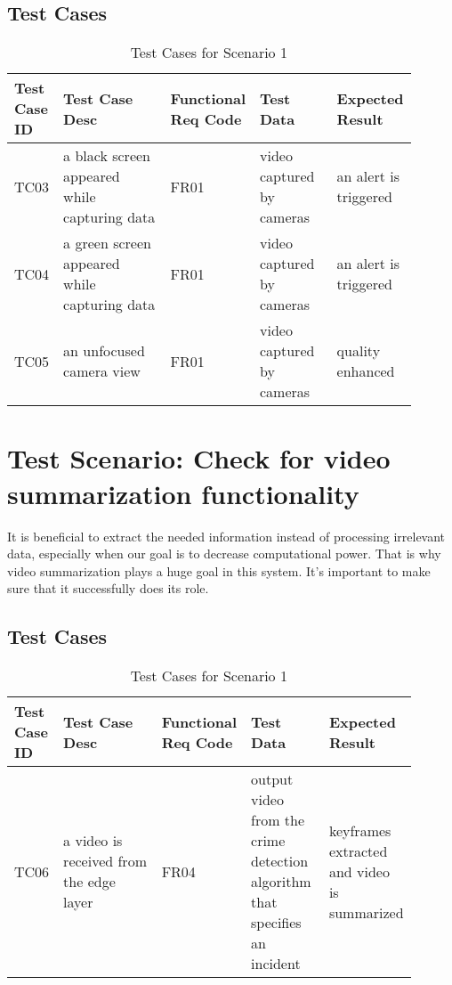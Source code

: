 \documentclass[12pt]{article}
\begin{document}
\subsection{Test Cases}
\begin{table}[h]
\caption{Test Cases for Scenario 1}
\label{tab:TC1}
\begin{tabular}{|p{0.1\linewidth}|p{0.3\linewidth}|p{0.1\linewidth}|p{0.2\linewidth}|p{0.2\linewidth}|}
\hline
Test Case ID & Test Case Desc & Functional Req Code & Test Data & Expected Result \\ \hline
TC03  & a black screen appeared while capturing data & FR01 &  video captured by cameras   &  an alert is triggered                \\ \hline
TC04 & a green screen appeared while capturing data   & FR01    &  video captured by cameras     &  an alert is triggered           \\ \hline
TC05 & an unfocused camera view  & FR01    &  video captured by cameras     &  quality enhanced          \\ \hline

\end{tabular}
\end{table}


\section{Test Scenario: Check for video summarization functionality}\label{sec:TSy}
It is beneficial to extract the needed information instead of processing irrelevant data, especially when our goal is to decrease computational power. That is why video summarization plays a huge goal in this system. It's important to make sure that it successfully does its role.
\subsection{Test Cases}
\begin{table}[h]
\caption{Test Cases for Scenario 1}
\label{tab:TC1}
\begin{tabular}{|p{0.1\linewidth}|p{0.3\linewidth}|p{0.1\linewidth}|p{0.2\linewidth}|p{0.2\linewidth}|}
\hline
Test Case ID & Test Case Desc & Functional Req Code & Test Data & Expected Result \\ \hline
TC06  & a video is received from the edge layer & FR04 &  output video from the crime detection algorithm that specifies an incident    &  keyframes extracted and video is summarized                \\ \hline

\end{tabular}
\end{table}
\end{document}
